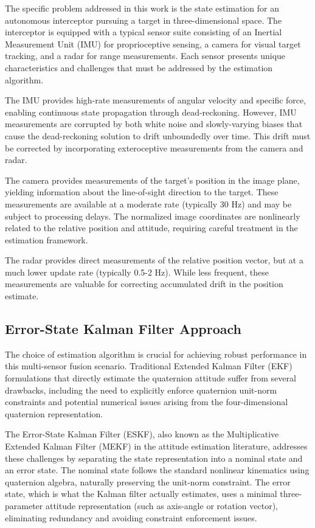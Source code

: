 \documentclass[11pt,a4paper]{article}
\begin{document}
The specific problem addressed in this work is the state estimation for an autonomous interceptor pursuing a target in three-dimensional space. The interceptor is equipped with a typical sensor suite consisting of an Inertial Measurement Unit (IMU) for proprioceptive sensing, a camera for visual target tracking, and a radar for range measurements. Each sensor presents unique characteristics and challenges that must be addressed by the estimation algorithm.

The IMU provides high-rate measurements of angular velocity and specific force, enabling continuous state propagation through dead-reckoning. However, IMU measurements are corrupted by both white noise and slowly-varying biases that cause the dead-reckoning solution to drift unboundedly over time. This drift must be corrected by incorporating exteroceptive measurements from the camera and radar.

The camera provides measurements of the target's position in the image plane, yielding information about the line-of-sight direction to the target. These measurements are available at a moderate rate (typically 30 Hz) and may be subject to processing delays. The normalized image coordinates are nonlinearly related to the relative position and attitude, requiring careful treatment in the estimation framework.

The radar provides direct measurements of the relative position vector, but at a much lower update rate (typically 0.5-2 Hz). While less frequent, these measurements are valuable for correcting accumulated drift in the position estimate.

\subsection{Error-State Kalman Filter Approach}

The choice of estimation algorithm is crucial for achieving robust performance in this multi-sensor fusion scenario. Traditional Extended Kalman Filter (EKF) formulations that directly estimate the quaternion attitude suffer from several drawbacks, including the need to explicitly enforce quaternion unit-norm constraints and potential numerical issues arising from the four-dimensional quaternion representation.

The Error-State Kalman Filter (ESKF), also known as the Multiplicative Extended Kalman Filter (MEKF) in the attitude estimation literature, addresses these challenges by separating the state representation into a nominal state and an error state. The nominal state follows the standard nonlinear kinematics using quaternion algebra, naturally preserving the unit-norm constraint. The error state, which is what the Kalman filter actually estimates, uses a minimal three-parameter attitude representation (such as axis-angle or rotation vector), eliminating redundancy and avoiding constraint enforcement issues.
\end{document}
